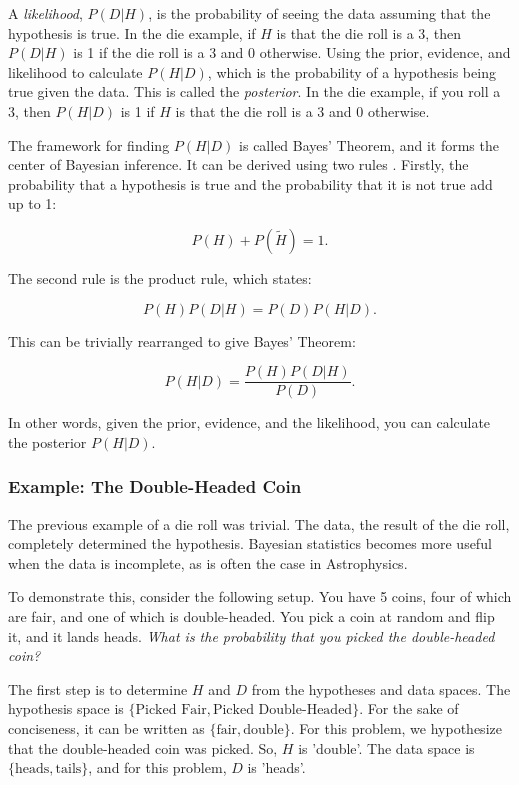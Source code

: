 \documentclass[preprint,longauthor]{aastex631}
\numberwithin{equation}{section}
\begin{document}
A \textit{likelihood}, $P(D|H)$, is the probability of seeing the data assuming that the hypothesis is true. In the die example, if $H$ is that the die roll is a 3, then $P(D|H)$ is 1 if the die roll is a 3 and 0 otherwise. Using the prior, evidence, and likelihood to calculate $P(H|D)$, which is the probability of a hypothesis being true given the data. This is called the \textit{posterior}. In the die example, if you roll a 3, then $P(H|D)$ is 1 if $H$ is that the die roll is a 3 and 0 otherwise.

The framework for finding $P(H|D)$ is called Bayes' Theorem, and it forms the center of Bayesian inference. It can be derived using two rules \citep{coxProbabilityFrequencyReasonable1946}. Firstly, the probability that a hypothesis is true and the probability that it is not true add up to 1:

\begin{equation}
  P(H) + P(\tilde{H}) = 1.
\end{equation}

The second rule is the product rule, which states:

\begin{equation}
  P(H)P(D|H) = P(D)P(H|D).
\end{equation}

This can be trivially rearranged to give Bayes' Theorem:

\begin{equation}
  P(H|D) = \frac{P(H)P(D|H)}{P(D)}.
  \label{eq:bayes_theorem}
\end{equation}

In other words, given the prior, evidence, and the likelihood, you can calculate the posterior $P(H|D)$.

\subsubsection{Example: The Double-Headed Coin}
The previous example of a die roll was trivial. The data, the result of the die roll, completely determined the hypothesis. Bayesian statistics becomes more useful when the data is incomplete, as is often the case in Astrophysics.

To demonstrate this, consider the following setup. You have 5 coins, four of which are fair, and one of which is double-headed. You pick a coin at random and flip it, and it lands heads. \textit{What is the probability that you picked the double-headed coin?}

The first step is to determine $H$ and $D$ from the hypotheses and data spaces. The hypothesis space is $\{\text{Picked Fair},\text{Picked Double-Headed}\}$. For the sake of conciseness, it can be written as $\{\text{fair},\text{double}\}$. For this problem, we hypothesize that the double-headed coin was picked. So, $H$ is 'double'. The data space is $\{\text{heads},\text{tails}\}$, and for this problem, $D$ is 'heads'.
\end{document}
